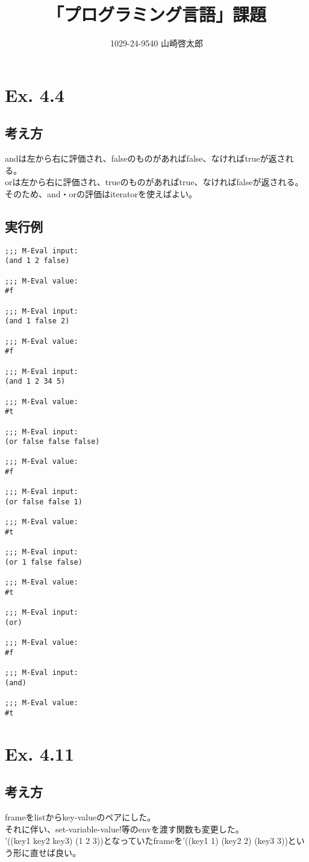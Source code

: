\documentclass[a4paper,12pt]{article}
\title{「プログラミング言語」課題}
\author{1029-24-9540 山崎啓太郎}
\begin{document}
\lstset{numbers=left,basicstyle=\small}
\maketitle

\section{Ex. 4.4}
\subsection{考え方}
andは左から右に評価され、falseのものがあればfalse、なければtrueが返される。\\
orは左から右に評価され、trueのものがあればtrue、なければfalseが返される。\\
そのため、and・orの評価はiteratorを使えばよい。\\
\subsection{実行例}
{\small
\begin{verbatim}
;;; M-Eval input:
(and 1 2 false)

;;; M-Eval value:
#f

;;; M-Eval input:
(and 1 false 2)

;;; M-Eval value:
#f

;;; M-Eval input:
(and 1 2 34 5)

;;; M-Eval value:
#t

;;; M-Eval input:
(or false false false)

;;; M-Eval value:
#f

;;; M-Eval input:
(or false false 1)

;;; M-Eval value:
#t

;;; M-Eval input:
(or 1 false false)

;;; M-Eval value:
#t

;;; M-Eval input:
(or)

;;; M-Eval value:
#f

;;; M-Eval input:
(and)

;;; M-Eval value:
#t

\end{verbatim}
}

\section{Ex. 4.11}
\subsection{考え方}
frameをlistからkey-valueのペアにした。\\
それに伴い、set-variable-value!等のenvを渡す関数も変更した。\\
'((key1 key2 key3) (1 2 3))となっていたframeを'((key1 1) (key2 2) (key3 3))という形に直せば良い。\\
\end{document}
